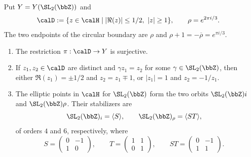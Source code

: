 Put $Y = Y(\SL_2(\bbZ))$ and
\[
    \calD := \{z \in \calH \mid |\Re(z)| \le 1/2,\ |z| \ge 1\}, \qquad \rho = e^{2\pi i/3}.
\]
The two endpoints of the circular boundary are $\rho$ and $\rho + 1 = -\overline\rho = e^{\pi i/3}$.

\begin{center}
\end{center}

\begin{proposition}\label{Prop:MF_standard_fundamental_domain}
    \leavevmode
    \begin{enumerate}
        \item The restriction $\pi : \calD \to Y$ is surjective.
        \item If $z_1, z_2 \in \calD$ are distinct and $\gamma z_1 = z_2$ for some $\gamma \in \SL_2(\bbZ)$, then either $\Re(z_1) = \pm 1/2$ and $z_2 = z_1 \mp 1$, or $|z_1| = 1$ and $z_2 = -1/z_1$.
        \item The elliptic points in $\calH$ for $\SL_2(\bbZ)$ form the two orbits $\SL_2(\bbZ)i$ and $\SL_2(\bbZ)\rho$. Their stabilizers are
        \[
            \SL_2(\bbZ)_i = \langle S\rangle, \qquad \SL_2(\bbZ)_\rho = \langle ST\rangle,
        \]
        of orders $4$ and $6$, respectively, where
        \[
            S = \begin{pmatrix}0 & -1\\ 1 & 0\end{pmatrix}, \qquad T = \begin{pmatrix}1 & 1\\ 0 & 1\end{pmatrix}, \qquad ST = \begin{pmatrix}0 & -1\\ 1 & 1\end{pmatrix}.
        \]
    \end{enumerate}
\end{proposition}

